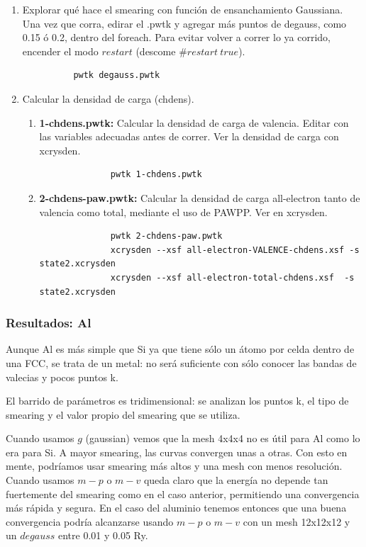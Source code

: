     \begin{enumerate}
      \item Explorar qué hace el smearing con función de ensanchamiento Gaussiana. Una vez que corra, edirar el .pwtk y agregar más puntos de degauss, como 0.15 ó 0.2, dentro del foreach. Para evitar volver a correr lo ya corrido, encender el modo $restart$ (descome $\#restart\ true$).
        \begin{verbatim}
          pwtk degauss.pwtk
        \end{verbatim}
      \item Calcular la densidad de carga (chdens).
        \begin{enumerate}
          \item \textbf{1-chdens.pwtk:}
            Calcular la densidad de carga de valencia. Editar con las variables adecuadas antes de correr. Ver la densidad de carga con xcrysden.
            \begin{verbatim}
              pwtk 1-chdens.pwtk
            \end{verbatim}
          \item \textbf{2-chdens-paw.pwtk:}
            Calcular la densidad de carga all-electron tanto de valencia como total, mediante el uso de PAWPP. Ver en xcrysden.
            \begin{verbatim}
              pwtk 2-chdens-paw.pwtk
              xcrysden --xsf all-electron-VALENCE-chdens.xsf -s state2.xcrysden
              xcrysden --xsf all-electron-total-chdens.xsf  -s state2.xcrysden
            \end{verbatim}
        \end{enumerate}
    \end{enumerate}

\subsubsection{Resultados: Al}

Aunque Al es más simple que Si ya que tiene sólo un átomo por celda dentro de una FCC, se trata de un metal: no será suficiente con sólo conocer las bandas de valecias y pocos puntos k.

El barrido de parámetros es tridimensional: se analizan los puntos k, el tipo de smearing y el valor propio del smearing que se utiliza.

Cuando usamos $g$ (gaussian) vemos que la mesh 4x4x4 no es útil para Al como lo era para Si. A mayor smearing, las curvas convergen unas a otras. Con esto en mente, podríamos usar smearing más altos y una mesh con menos resolución. Cuando usamos $m-p$ o $m-v$ queda claro que la energía no depende tan fuertemente del smearing como en el caso anterior, permitiendo una convergencia más rápida y segura. En el caso del aluminio tenemos entonces que una buena convergencia podría alcanzarse usando $m-p$ o $m-v$ con un mesh 12x12x12 y un $degauss$ entre 0.01 y 0.05 Ry.

